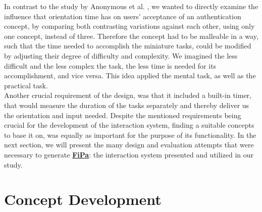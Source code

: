 In contrast to the study by Anonymous et al. \cite{anonymous}, we wanted to directly examine the influence that orientation time has on users' acceptance of an authentication concept, by comparing both contrasting variations against each other, using only one concept, instead of three. Therefore the concept had to be malleable in a way, such that the time needed to accomplish the miniature tasks, could be modified by adjusting their degree of difficulty and complexity. We imagined the less difficult and the less complex the task, the less time is needed for its accomplishment, and vice versa. This idea applied the mental task, as well as the practical task. \\

Another crucial requirement of the design, was that it included a built-in timer, that would measure the duration of the tasks separately and thereby deliver us the orientation and input needed. Despite the mentioned requirements being crucial for the development of the interaction system, finding a suitable concepts to base it on, was equally as important for the purpose of its functionality. In the next section, we will present the many design and evaluation attempts that were necessary to generate \underline{\textbf{FiPa}}: the interaction system presented and utilized in our study. 

\section{Concept Development}

